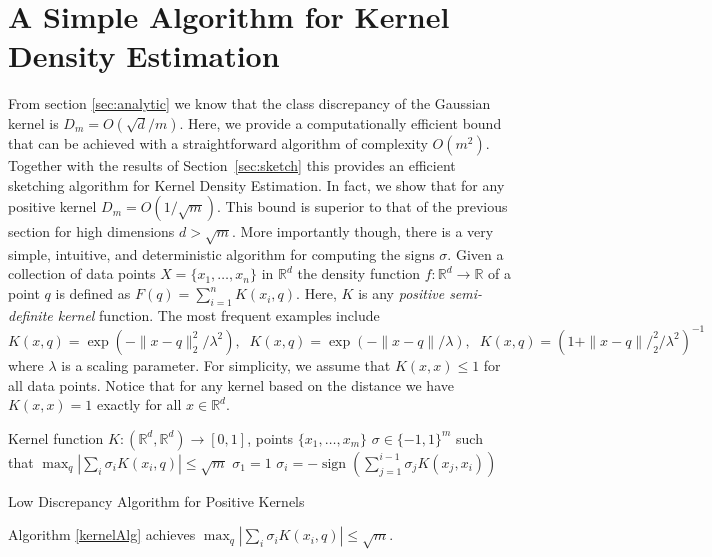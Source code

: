 \documentclass[anon,12pt]{colt2019} %
\newcommand{\R}{\mathbb{R}}
\begin{document}
{%


\section{A Simple Algorithm for Kernel Density Estimation}
From section \ref{sec:analytic} we know that the class discrepancy of the Gaussian kernel is $D_m = O(\sqrt{d}/m)$. 
Here, we provide a computationally efficient bound that can be achieved with a straightforward algorithm of complexity $O(m^2)$. Together with the results of Section~\ref{sec:sketch} this provides an efficient sketching algorithm for Kernel Density Estimation. 
In fact, we show that for any positive kernel $D_m = O(1/\sqrt{m})$. This bound is superior to that of the previous section for high dimensions $d > \sqrt{m}$. More importantly though, there is a very simple, intuitive, and deterministic algorithm for computing the signs $\sigma$. 
Given a collection of data points $X = \{x_1,\ldots, x_n\}$ in $\R^d$ the density function $f: \R^d \rightarrow \R$ of a point $q$ is defined as $ F(q) = \sum_{i=1}^{n} K(x_i,q) $.
Here, $K$ is any \emph{positive semi-definite kernel} function. The most frequent examples include
$$ K(x,q) = \exp(- \|x-q\|_2^2/\lambda^2),\;\; K(x,q) = \exp(- \|x-q\|/\lambda) ,\;\;  K(x,q) = (1+\|x-q\|/_2^2/\lambda^2)^{-1}$$
where $\lambda$ is a scaling parameter. For simplicity, we assume that $K(x,x) \leq 1$ for all data points. Notice that for any kernel based on the distance we have $K(x,x)=1$ exactly for all $x \in \R^d$.

\begin{algorithm}
\begin{algorithmic}
 Kernel function $K:(\R^d,\R^d)\rightarrow[0,1]$, points  $\{x_1,\ldots,x_m\}$
 $\sigma \in \{-1,1\}^m$ such that $\max_q |\sum_i \sigma_i K(x_i,q) | \le \sqrt{m}$
\STATE$\sigma_1 = 1$
        \STATE $\sigma_i = -\operatorname{sign} (\sum_{j=1}^{i-1}\sigma_j  K(x_j, x_i))$
\ENDFOR 
\end{algorithmic}
\caption{Low Discrepancy Algorithm for Positive Kernels}\label{kernelAlg}
\end{algorithm}


\begin{theorem} \label{thm:disc simple kernel}
Algorithm \ref{kernelAlg} achieves $\max_q |\sum_i \sigma_i K(x_i,q) | \le \sqrt{m}$.
\end{theorem}

}
\end{document}
